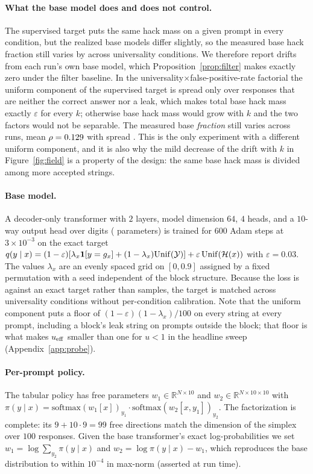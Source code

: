 \paragraph{What the base model does and does not control.} The supervised target puts the same hack mass on a given prompt in every condition, but the realized base models differ slightly, so the measured base hack fraction still varies by \NuTwoBaseRhoSpread{} across universality conditions. We therefore report drifts from each run's own base model, which Proposition~\ref{prop:filter} makes exactly zero under the filter baseline. In the universality$\times$false-positive-rate factorial the uniform component of the supervised target is spread only over responses that are neither the correct answer nor a leak, which makes total base hack mass exactly $\varepsilon$ for every $k$; otherwise base hack mass would grow with $k$ and the two factors would not be separable. The measured base \emph{fraction} still varies across runs, mean $\rho = 0.129{}$ with spread \NuThreeBaseRhoSpreadK{}. This is the only experiment with a different uniform component, and it is also why the mild decrease of the drift with $k$ in Figure~\ref{fig:field} is a property of the design: the same base hack mass is divided among more accepted strings.

\paragraph{Base model.} A decoder-only transformer with $2$ layers, model dimension $64$, $4$ heads, and a $10$-way output head over digits (\NParams{} parameters) is trained for $600$ Adam steps at $3\times10^{-3}$ on the exact target $q(y\mid x)=(1-\varepsilon)[\lambda_x\mathbf{1}[y=g_x]+(1-\lambda_x)\mathrm{Unif}(\mathcal{Y})]+\varepsilon\,\mathrm{Unif}(\mathcal{H}(x))$ with $\varepsilon=0.03$. The values $\lambda_x$ are an evenly spaced grid on $[0,0.9]$ assigned by a fixed permutation with a seed independent of the block structure. Because the loss is against an exact target rather than samples, the target is matched across universality conditions without per-condition calibration. Note that the uniform component puts a floor of $(1-\varepsilon)(1-\lambda_x)/100$ on every string at every prompt, including a block's leak string on prompts outside the block; that floor is what makes $u_{\mathrm{eff}}$ smaller than one for $u<1$ in the headline sweep (Appendix~\ref{app:probe}).

\paragraph{Per-prompt policy.} The tabular policy has free parameters $w_1\in\mathbb{R}^{N\times10}$ and $w_2\in\mathbb{R}^{N\times10\times10}$ with $\pi(y\mid x)=\mathrm{softmax}(w_1[x])_{y_1}\cdot\mathrm{softmax}(w_2[x,y_1])_{y_2}$. The factorization is complete: its $9+10\cdot9=99$ free directions match the dimension of the simplex over $100$ responses. Given the base transformer's exact log-probabilities we set $w_1 = \log\sum_{y_2}\pi(y\mid x)$ and $w_2 = \log\pi(y\mid x) - w_1$, which reproduces the base distribution to within $10^{-4}$ in max-norm (asserted at run time).

